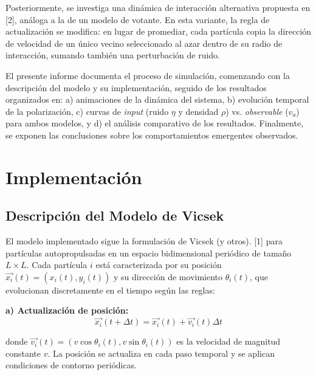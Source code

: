 \documentclass{article}
\begin{document}
\medskip

Posteriormente, se investiga una dinámica de interacción alternativa propuesta en [2], análoga a la de un modelo de votante. En esta variante, la regla de actualización se modifica: en lugar de promediar, cada partícula copia la dirección de velocidad de un único vecino seleccionado al azar dentro de su radio de interacción, sumando también una perturbación de ruido.

\medskip

El presente informe documenta el proceso de simulación, comenzando con la descripción del modelo y su implementación, seguido de los resultados organizados en: a) animaciones de la dinámica del sistema, b) evolución temporal de la polarización, c) curvas de \textit{input} (ruido $\eta$ y densidad $\rho$) vs. \textit{observable} ($v_a$) para ambos modelos, y d) el análisis comparativo de los resultados. Finalmente, se exponen las conclusiones sobre los comportamientos emergentes observados.

\section{Implementación}

\subsection{Descripción del Modelo de Vicsek}
El modelo implementado sigue la formulación de Vicsek (y otros). [1] para partículas autopropulsadas en un espacio bidimensional periódico de tamaño $L \times L$. Cada partícula $i$ está caracterizada por su posición $\vec{x_i}(t) = (x_i(t), y_i(t))$ y su dirección de movimiento $\theta_i(t)$, que evolucionan discretamente en el tiempo según las reglas:

\textbf{a) Actualización de posición:}
\begin{equation}
\vec{x_i}(t + \Delta t) = \vec{x_i}(t) + \vec{v_i}(t) \Delta t
\label{eq:posicion}
\end{equation}

donde $\vec{v_i}(t) = (v \cos \theta_i(t), v \sin \theta_i(t))$ es la velocidad de magnitud constante $v$. La posición se actualiza en cada paso temporal y se aplican condiciones de contorno periódicas.
\end{document}
